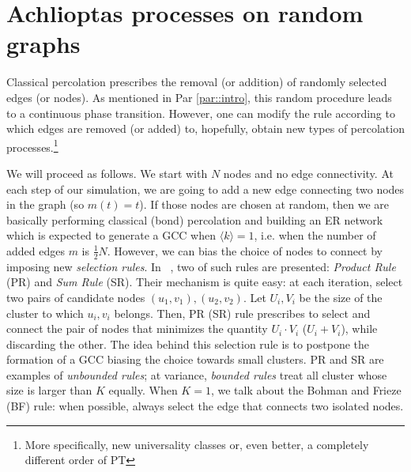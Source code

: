 \section{Achlioptas processes on random graphs}
\label{par:Achlioptas}
Classical percolation prescribes the removal (or addition) of randomly selected edges (or nodes). As mentioned in Par \ref{par::intro}, this random procedure leads to a continuous phase transition. However, one can modify the rule according to which edges are removed (or added) to, hopefully, obtain new types of percolation processes.\footnote{More specifically, new universality classes or, even better, a completely different order of PT}

We will proceed as follows. We start with $N$ nodes and no edge connectivity. At each step of our simulation, we are going to add a new edge connecting two nodes in the graph (so $m(t) = t$). If those nodes are chosen at random, then we are basically performing classical (bond) percolation and building an ER network which is expected to generate a GCC when $\langle k \rangle = 1$, i.e. when the number of added edges $m$ is $\frac{1}{2}N$. However, we can bias the choice of nodes to connect by imposing new \textit{selection rules}. In ~\cite{Achlioptas}, two of such rules are presented: \textit{Product Rule} (PR) and \textit{Sum Rule} (SR). Their mechanism is quite easy: at each iteration, select two pairs of candidate nodes $(u_1, v_1), (u_2, v_2)$. Let $U_i, V_i$ be the size of the cluster to which $u_i, v_i$ belongs. Then, PR (SR) rule prescribes to select and connect the pair of nodes that minimizes the quantity $U_i \cdot V_i$ ($U_i + V_i$), while discarding the other. The idea behind this selection rule is to postpone the formation of a GCC biasing the choice towards small clusters. PR and SR are examples of \textit{unbounded rules}; at variance, \textit{bounded rules} treat all cluster whose size is larger than $K$ equally. When $K=1$, we talk about the Bohman and Frieze (BF) rule: when possible, always select the edge that connects two isolated nodes. 

